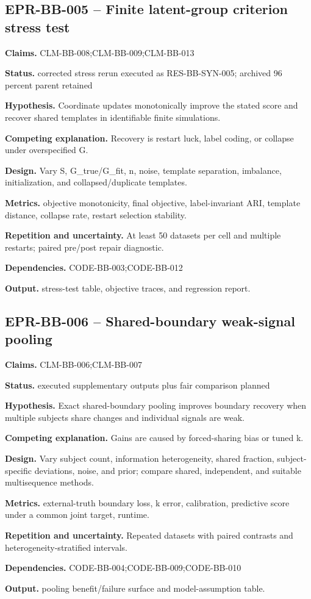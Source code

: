 \subsection{EPR-BB-005 -- Finite latent-group criterion stress test}
\textbf{Claims.} CLM-BB-008;CLM-BB-009;CLM-BB-013\par
\textbf{Status.} corrected stress rerun executed as RES-BB-SYN-005; archived 96 percent parent retained\par
\textbf{Hypothesis.} Coordinate updates monotonically improve the stated score and recover shared templates in identifiable finite simulations.\par
\textbf{Competing explanation.} Recovery is restart luck, label coding, or collapse under overspecified G.\par
\textbf{Design.} Vary S, G\_true/G\_fit, n, noise, template separation, imbalance, initialization, and collapsed/duplicate templates.\par
\textbf{Metrics.} objective monotonicity, final objective, label-invariant ARI, template distance, collapse rate, restart selection stability.\par
\textbf{Repetition and uncertainty.} At least 50 datasets per cell and multiple restarts; paired pre/post repair diagnostic.\par
\textbf{Dependencies.} CODE-BB-003;CODE-BB-012\par
\textbf{Output.} stress-test table, objective traces, and regression report.

\subsection{EPR-BB-006 -- Shared-boundary weak-signal pooling}
\textbf{Claims.} CLM-BB-006;CLM-BB-007\par
\textbf{Status.} executed supplementary outputs plus fair comparison planned\par
\textbf{Hypothesis.} Exact shared-boundary pooling improves boundary recovery when multiple subjects share changes and individual signals are weak.\par
\textbf{Competing explanation.} Gains are caused by forced-sharing bias or tuned k.\par
\textbf{Design.} Vary subject count, information heterogeneity, shared fraction, subject-specific deviations, noise, and prior; compare shared, independent, and suitable multisequence methods.\par
\textbf{Metrics.} external-truth boundary loss, k error, calibration, predictive score under a common joint target, runtime.\par
\textbf{Repetition and uncertainty.} Repeated datasets with paired contrasts and heterogeneity-stratified intervals.\par
\textbf{Dependencies.} CODE-BB-004;CODE-BB-009;CODE-BB-010\par
\textbf{Output.} pooling benefit/failure surface and model-assumption table.

